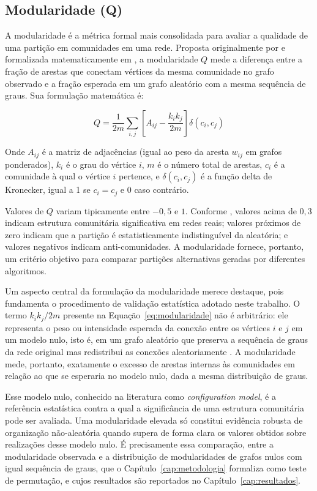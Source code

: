 \documentclass[
      12pt,
      a4paper,
      openright,
      oneside,
      chapter=TITLE,
      section=TITLE,
      english,
      french,
      spanish,
      brazilian
    ]{abntex2}
\begin{document}
    \subsection{Modularidade (Q)}
    
    A modularidade é a métrica formal mais consolidada para avaliar a qualidade de uma partição em comunidades em uma rede. Proposta originalmente por \cite{newman2004} e formalizada matematicamente em , a modularidade $Q$ mede a diferença entre a fração de arestas que conectam vértices da mesma comunidade no grafo observado e a fração esperada em um grafo aleatório com a mesma sequência de graus. Sua formulação matemática é:
    
    \begin{equation}
        Q = \frac{1}{2m} \sum_{i,j} \left[ A_{ij} - \frac{k_i k_j}{2m} \right] \delta(c_i, c_j)
        \label{eq:modularidade}
    \end{equation}
    
    Onde $A_{ij}$ é a matriz de adjacências (igual ao peso da aresta $w_{ij}$ em grafos ponderados), $k_i$ é o grau do vértice $i$, $m$ é o número total de arestas, $c_i$ é a comunidade à qual o vértice $i$ pertence, e $\delta(c_i, c_j)$ é a função delta de Kronecker, igual a 1 se $c_i = c_j$ e 0 caso contrário.
    
    Valores de $Q$ variam tipicamente entre $-0{,}5$ e $1$. Conforme , valores acima de $0{,}3$ indicam estrutura comunitária significativa em redes reais; valores próximos de zero indicam que a partição é estatisticamente indistinguível da aleatória; e valores negativos indicam anti-comunidades. A modularidade fornece, portanto, um critério objetivo para comparar partições alternativas geradas por diferentes algoritmos.
    
    Um aspecto central da formulação da modularidade merece destaque, pois fundamenta o procedimento de validação estatística adotado neste trabalho. O termo $k_i k_j / 2m$ presente na Equação~\ref{eq:modularidade} não é arbitrário: ele representa o peso ou intensidade esperada da conexão entre os vértices $i$ e $j$ em um modelo nulo, isto é, em um grafo aleatório que preserva a sequência de graus da rede original mas redistribui as conexões aleatoriamente \cite{newman2010}. A modularidade mede, portanto, exatamente o excesso de arestas internas às comunidades em relação ao que se esperaria no modelo nulo, dada a mesma distribuição de graus.
    
    Esse modelo nulo, conhecido na literatura como \textit{configuration model}, é a referência estatística contra a qual a significância de uma estrutura comunitária pode ser avaliada. Uma modularidade elevada só constitui evidência robusta de organização não-aleatória quando supera de forma clara os valores obtidos sobre realizações desse modelo nulo. É precisamente essa comparação, entre a modularidade observada e a distribuição de modularidades de grafos nulos com igual sequência de graus, que o Capítulo~\ref{cap:metodologia} formaliza como teste de permutação, e cujos resultados são reportados no Capítulo~\ref{cap:resultados}.
    
\end{document}
